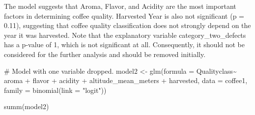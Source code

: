 \documentclass[
  letterpaper,
  DIV=11,
  numbers=noendperiod]{scrartcl}
\newenvironment{Shaded}{\begin{snugshade}}{\end{snugshade}}
\newcommand{\AttributeTok}[1]{\textcolor[rgb]{0.40,0.45,0.13}{#1}}
\newcommand{\CommentTok}[1]{\textcolor[rgb]{0.37,0.37,0.37}{#1}}
\newcommand{\FunctionTok}[1]{\textcolor[rgb]{0.28,0.35,0.67}{#1}}
\newcommand{\NormalTok}[1]{\textcolor[rgb]{0.00,0.23,0.31}{#1}}
\newcommand{\OtherTok}[1]{\textcolor[rgb]{0.00,0.23,0.31}{#1}}
\newcommand{\SpecialCharTok}[1]{\textcolor[rgb]{0.37,0.37,0.37}{#1}}
\newcommand{\StringTok}[1]{\textcolor[rgb]{0.13,0.47,0.30}{#1}}
\begin{document}
The model suggests that Aroma, Flavor, and Acidity are the most
important factors in determining coffee quality. Harvested Year is also
not significant (p = 0.11), suggesting that coffee quality
classification does not strongly depend on the year it was harvested.
Note that the explanatory variable category\_two\_defects has a p-value
of 1, which is not significant at all. Consequently, it should not be
considered for the further analysis and should be removed initially.

\begin{Shaded}
\begin{Highlighting}[]
\CommentTok{\# Model with one variable dropped.}
\NormalTok{model2 }\OtherTok{\textless{}{-}} \FunctionTok{glm}\NormalTok{(}\AttributeTok{formula =}\NormalTok{ Qualityclass}\SpecialCharTok{\textasciitilde{}}\NormalTok{ aroma }\SpecialCharTok{+}\NormalTok{ flavor }\SpecialCharTok{+}\NormalTok{ acidity }\SpecialCharTok{+}
\NormalTok{               altitude\_mean\_meters }\SpecialCharTok{+} 
\NormalTok{               harvested,}
             \AttributeTok{data =}\NormalTok{ coffee1,}
             \AttributeTok{family =} \FunctionTok{binomial}\NormalTok{(}\AttributeTok{link =} \StringTok{"logit"}\NormalTok{))}

\FunctionTok{summ}\NormalTok{(model2)}
\end{Highlighting}
\end{Shaded}
\end{document}
